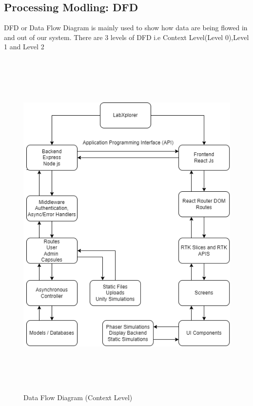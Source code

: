 \subsection{Processing Modling: DFD}
DFD or Data Flow Diagram is mainly used to show how data are being flowed in and out of our system. There are 3 levels of DFD i.e Context Level(Level 0),Level 1 and Level 2
\begin{figure}[H]
    \centering
    \includegraphics[height = 18cm]{Diagrams/DFD Process Modeling.png}
    \caption{Data Flow Diagram (Context Level)}
\end{figure}
\newpage
